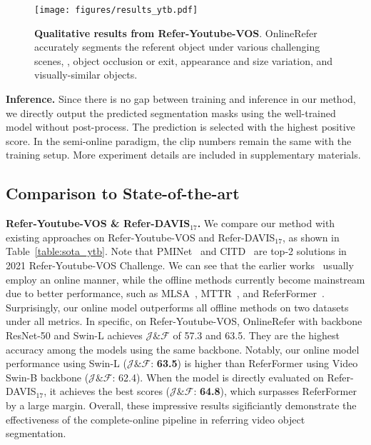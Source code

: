 \documentclass[10pt,twocolumn,letterpaper]{article}
\begin{document}
\begin{figure*}
\centering
	\texttt{[image: figures/results\_ytb.pdf]}
	\vspace{-10pt}
	\caption{\textbf{Qualitative results from Refer-Youtube-VOS}. OnlineRefer accurately segments the referent object under various challenging scenes, \eg, object occlusion or exit, appearance and size variation, and visually-similar objects.}
	\vspace{-4pt}
	\label{fig:result_ytb}
\end{figure*}

\noindent\textbf{Inference.}
Since there is no gap between training and inference in our method, we directly output the predicted segmentation masks using the well-trained model without post-process.
The prediction is selected with the highest positive score.
In the semi-online paradigm, the clip numbers remain the same with the training setup.
More experiment details are included in supplementary materials.




\subsection{Comparison to State-of-the-art}

\noindent\textbf{Refer-Youtube-VOS \& Refer-DAVIS$_{17}$.}
We compare our method with existing approaches on Refer-Youtube-VOS and Refer-DAVIS$_{17}$, as shown in Table~\ref{table:sota_ytb}.
Note that PMINet~\cite{ding2021progressive} and CITD~\cite{liang2021rethinking} are top-2 solutions in 2021 Refer-Youtube-VOS Challenge.
We can see that the earlier works~\cite{CMSA,URVOS} usually employ an online manner, while the offline methods currently become mainstream due to better performance, such as MLSA~\cite{mlsa}, MTTR~\cite{mttr}, and ReferFormer~\cite{referformer}.
Surprisingly, our online model outperforms all offline methods on two datasets under all metrics.
In specific, on Refer-Youtube-VOS, OnlineRefer with backbone ResNet-50 and Swin-L achieves $\mathcal{J} \& \mathcal{F}$ of 57.3 and 63.5.
They are the highest accuracy among the models using the same backbone.
Notably, our online model performance using Swin-L ($\mathcal{J} \& \mathcal{F}$: \textbf{63.5}) is higher than ReferFormer using Video Swin-B backbone ($\mathcal{J} \& \mathcal{F}$: 62.4).
When the model is directly evaluated on Refer-DAVIS$_{17}$, it achieves the best scores ($\mathcal{J} \& \mathcal{F}$: \textbf{64.8}), which surpasses ReferFormer by a large margin.
Overall, these impressive results sigificiantly demonstrate the effectiveness of the complete-online pipeline in referring video object segmentation.
\end{document}
